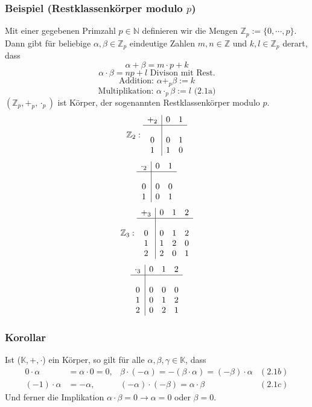 \subsubsection{Beispiel (Restklassenkörper modulo $p$)}
Mit einer gegebenen Primzahl $p\in\mathbb{N}$ definieren wir die Mengen $\mathbb{Z}_p := \{0,\cdots ,p\}$.  Dann gibt für beliebige $\alpha ,\beta \in \mathbb{Z}_p$ eindeutige Zahlen $m,n\in\mathbb{Z}$ und $k,l\in\mathbb{Z}_p$ derart, dass 
\[\alpha + \beta = m\cdot p+k\]
\[\alpha\cdot\beta = np+l \text{ Divison mit Rest.}\]
\[\text{Addition: }\alpha+_p \beta := k\]
\[\text{Multiplikation: }\alpha \cdot_p \beta := l\text{ (2.1a)}\]
$(\mathbb{Z}_p,+_p,\cdot_p)$ ist Körper, der sogenannten Restklassenkörper modulo $p$.
\[\mathbb{Z}_2: \begin{array}{c|cc}+_2 & 0 & 1\\ \hline\\ 0 & 0 & 1 \\ 1 & 1 & 0\end{array} \]
\[\begin{array}{c|cc}\cdot_2 & 0 & 1\\ \hline \\ 0 & 0 & 0 \\ 1 & 0 & 1\end{array} \]
\[\mathbb{Z}_3: \begin{array}{c|ccc}+_3 & 0 & 1 & 2\\ \hline \\ 0 & 0 & 1 & 2\\ 1 & 1 & 2 & 0\\2 & 2 & 0 & 1\end{array} \]
\[\begin{array}{c|ccc}\cdot_3 & 0 & 1 & 2\\ \hline \\ 0 & 0 & 0 & 0\\ 1 & 0 & 1 & 2\\2 & 0 & 2 & 1\end{array} \]
\subsubsection{Korollar}
Ist ($\mathbb{K},+,\cdot $) ein Körper, so gilt für alle $\alpha ,\beta ,\gamma \in \mathbb{K}$, dass
\begin{align*}
0\cdot \alpha &= \alpha \cdot 0 = 0, & \beta\cdot (-\alpha ) = -(\beta \cdot \alpha ) = (-\beta )\cdot \alpha &(2.1b)\\
(-1)\cdot \alpha &= -\alpha , & (-\alpha )\cdot (-\beta ) = \alpha\cdot\beta &(2.1c)
\end{align*}
Und ferner die Implikation $\alpha\cdot\beta = 0 \rightarrow \alpha = 0$ oder $\beta = 0$.
